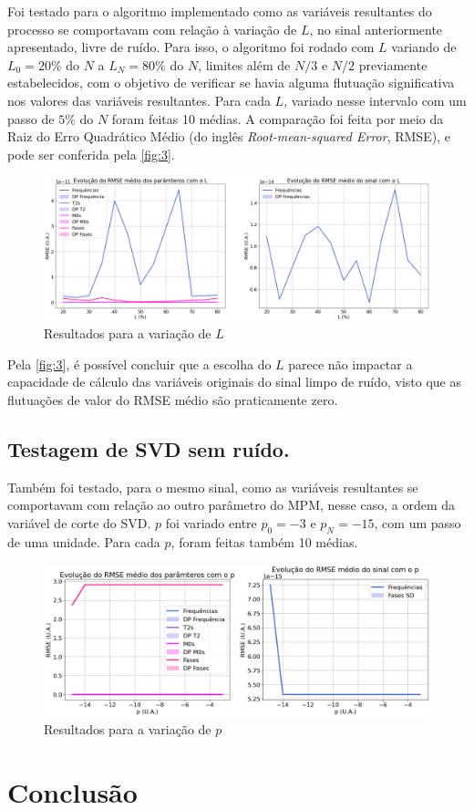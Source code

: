 \documentclass[12pt]{article}
\begin{document}
Foi testado para o algoritmo implementado como as variáveis resultantes do processo se comportavam com relação à variação de $L$, no sinal 
anteriormente apresentado, livre de ruído. Para isso, o algoritmo foi rodado com $L$ variando de $L_0 = 20\%$ do $N$ a $L_N = 80\%$ do $N$, 
limites além de $N/3$ e $N/2$ previamente estabelecidos, com o objetivo de verificar se havia alguma flutuação significativa nos valores das 
variáveis resultantes. Para cada $L$, variado nesse intervalo com um passo de $5\%$ do $N$ foram feitas 10 médias. A comparação foi feita por 
meio da Raiz do Erro Quadrático Médio (do inglês \textit{Root-mean-squared Error}, RMSE), e pode ser conferida pela \autoref{fig:3}.

\begin{figure} [H]
    \centering
    \includegraphics[scale=0.3125]{RMSE-L.png}
    \caption{Resultados para a variação de $L$}
    \label{fig:3}
\end{figure}

Pela \autoref{fig:3}, é possível concluir que a escolha do $L$ parece não impactar a capacidade de cálculo das variáveis originais do sinal 
limpo de ruído, visto que as flutuações de valor do RMSE médio são praticamente zero.

\subsection{Testagem de SVD sem ruído.}

Também foi testado, para o mesmo sinal, como as variáveis resultantes se comportavam com relação ao outro parâmetro do MPM, nesse caso, a 
ordem da variável de corte do SVD. $p$ foi variado entre $p_0 = -3$ e $p_N = -15$, com um passo de uma unidade. Para cada $p$, foram feitas 
também 10 médias. 

\begin{figure} [H]
    \centering
    \includegraphics[scale=0.4166]{RMSE-p.png}
    \caption{Resultados para a variação de $p$}
    \label{fig:4}
\end{figure}

\section{Conclusão}






\end{document}
